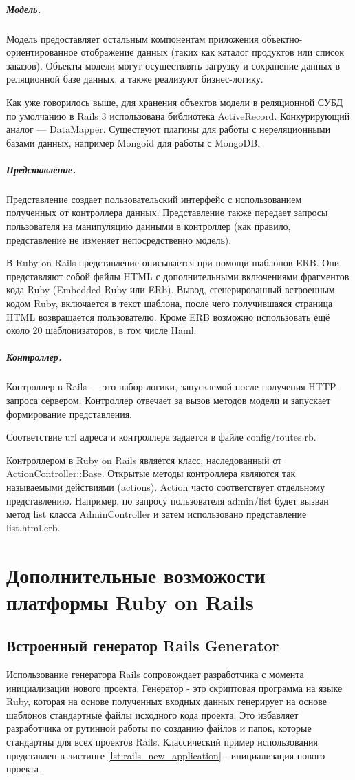 \subparagraph{Модель.} 
Модель предоставляет остальным компонентам приложения объектно-ориентированное
отображение данных (таких как каталог продуктов или список заказов). Объекты
модели могут осуществлять загрузку и сохранение данных в реляционной базе
данных, а также реализуют бизнес-логику.

Как уже говорилось выше, для хранения объектов модели в реляционной СУБД по
умолчанию в Rails 3 использована библиотека ActiveRecord. Конкурирующий аналог —
DataMapper. Существуют плагины для работы с нереляционными базами данных,
например Mongoid для работы с MongoDB.

\subparagraph{Представление.}
Представление создает пользовательский интерфейс с использованием полученных от
контроллера данных. Представление также передает запросы пользователя на
манипуляцию данными в контроллер (как правило, представление не изменяет
непосредственно модель).

В Ruby on Rails представление описывается при помощи шаблонов ERB. Они
представляют собой файлы HTML с дополнительными включениями фрагментов кода Ruby
(Embedded Ruby или ERb). Вывод, сгенерированный встроенным кодом Ruby,
включается в текст шаблона, после чего получившаяся страница HTML возвращается
пользователю. Кроме ERB возможно использовать ещё около 20 шаблонизаторов, в том
числе Haml.

\subparagraph{Контроллер.}
Контроллер в Rails — это набор логики, запускаемой после получения HTTP-запроса
сервером. Контроллер отвечает за вызов методов модели и запускает формирование
представления.

Соответствие url адреса и контроллера задается в файле config/routes.rb.

Контроллером в Ruby on Rails является класс, наследованный от \\
ActionController::Base. Открытые методы контроллера являются так называемыми
действиями (actions). Action часто соответствует отдельному представлению.
Например, по запросу пользователя admin/list будет вызван метод list класса
AdminController и затем использовано представление \\ list.html.erb.

\section{Дополнительные возможости платформы Ruby on Rails}
\subsection{Встроенный генератор Rails Generator}
Использование генератора Rails сопровождает разработчика с момента инициализации
нового проекта. Генератор - это скриптовая программа на языке Ruby, которая на
основе полученных входных данных генерирует на основе шаблонов стандартные файлы
исходного кода проекта. Это избавляет разработчика от рутинной работы по
созданию файлов и папок, которые стандартны для всех проектов Rails.
Классический пример использования представлен в листинге
\ref{lst:rails_new_application}  - инициализация нового проекта .

